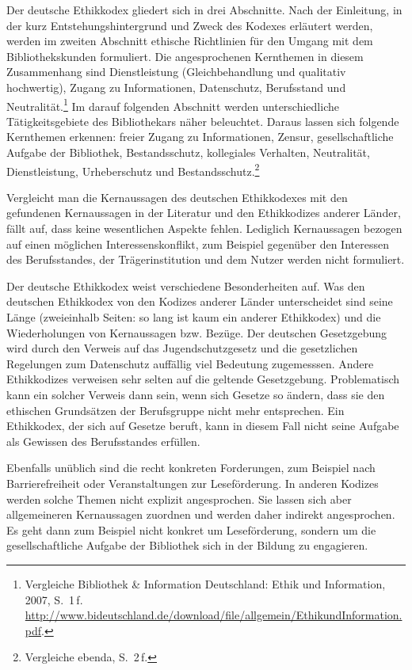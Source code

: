 \documentclass[output=paper]{langscibook}
\begin{document}
Der deutsche Ethikkodex gliedert sich in drei Abschnitte. Nach der
Einleitung, in der kurz Entstehungshintergrund und Zweck des Kodexes
erläutert werden, werden im zweiten Abschnitt ethische Richtlinien für
den Umgang mit dem Bibliothekskunden formuliert. Die angesprochenen
Kernthemen in diesem Zusammenhang sind Dienstleistung (Gleichbehandlung
und qualitativ hochwertig), Zugang zu Informationen, Datenschutz,
Berufsstand und Neutralität.\footnote{Vergleiche Bibliothek \& Information
  Deutschland: Ethik und Information, 2007, S.~1\,f.
  \url{http://www.bideutschland.de/download/file/allgemein/EthikundInformation.pdf}.}
Im darauf folgenden Abschnitt werden unterschiedliche Tätigkeitsgebiete
des Bibliothekars näher beleuchtet. Daraus lassen sich folgende
Kernthemen erkennen: freier Zugang zu Informationen, Zensur,
gesellschaftliche Aufgabe der Bibliothek, Bestandsschutz, kollegiales
Verhalten, Neutralität, Dienstleistung, Urheberschutz und
Bestandsschutz.\footnote{Vergleiche ebenda, S.~2\,f.}

Vergleicht man die Kernaussagen des deutschen Ethikkodexes mit den
gefundenen Kernaussagen in der Literatur und den Ethikkodizes anderer
Länder, fällt auf, dass keine wesentlichen Aspekte fehlen. Lediglich
Kernaussagen bezogen auf einen möglichen Interessenskonflikt, zum
Beispiel gegenüber den Interessen des Berufsstandes, der
Trägerinstitution und dem Nutzer werden nicht formuliert.

Der deutsche Ethikkodex weist verschiedene Besonderheiten auf. Was den
deutschen Ethikkodex von den Kodizes anderer Länder unterscheidet sind
seine Länge (zweieinhalb Seiten: so lang ist kaum ein anderer
Ethikkodex) und die Wiederholungen von Kernaussagen bzw. Bezüge. Der
deutschen Gesetzgebung wird durch den Verweis auf das Jugendschutzgesetz
und die gesetzlichen Regelungen zum Datenschutz auffällig viel Bedeutung
zugemesssen. Andere Ethikkodizes verweisen sehr selten auf die geltende
Gesetzgebung. Problematisch kann ein solcher Verweis dann sein, wenn
sich Gesetze so ändern, dass sie den ethischen Grundsätzen der
Berufsgruppe nicht mehr entsprechen. Ein Ethikkodex, der sich auf
Gesetze beruft, kann in diesem Fall nicht seine Aufgabe als Gewissen des
Berufsstandes erfüllen.

Ebenfalls unüblich sind die recht konkreten Forderungen, zum Beispiel
nach Barrierefreiheit oder Veranstaltungen zur Leseförderung. In anderen
Kodizes werden solche Themen nicht explizit angesprochen. Sie lassen
sich aber allgemeineren Kernaussagen zuordnen und werden daher indirekt
angesprochen. Es geht dann zum Beispiel nicht konkret um Leseförderung,
sondern um die gesellschaftliche Aufgabe der Bibliothek sich in der
Bildung zu engagieren.
\end{document}
